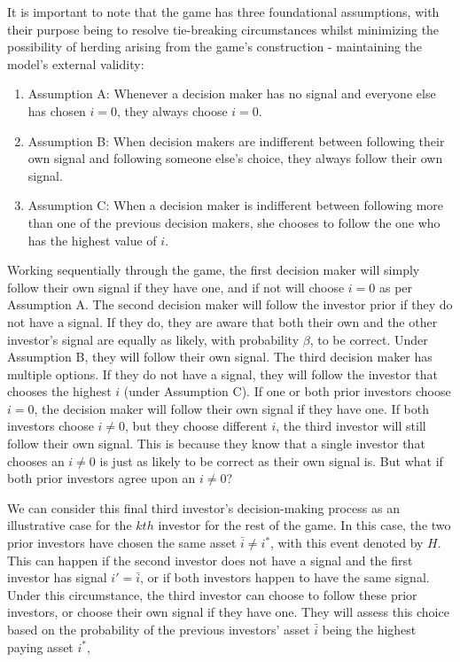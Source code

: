 \documentclass[12pt]{article}
\numberwithin{table}{section}   %
\begin{document}
It is important to note that the game has three foundational assumptions, with their purpose being to resolve tie-breaking circumstances whilst minimizing the possibility of herding arising from the game’s construction - maintaining the model’s external validity:

\begin{enumerate}
    \item Assumption A: Whenever a decision maker has no signal and everyone else has chosen $i=0$, they always choose $i=0$.
    \item Assumption B: When decision makers are indifferent between following their own signal and following someone else’s choice, they always follow their own signal.
    \item Assumption C: When a decision maker is indifferent between following more than one of the previous decision makers, she chooses to follow the one who has the highest value of $i$.
\end{enumerate}

Working sequentially through the game, the first decision maker will simply follow their own signal if they have one, and if not will choose $i=0$ as per Assumption A. The second decision maker will follow the investor prior if they do not have a signal. If they do, they are aware that both their own and the other investor’s signal are equally as likely, with probability $\beta$, to be correct. Under Assumption B, they will follow their own signal. The third decision maker has multiple options. If they do not have a signal, they will follow the investor that chooses the highest $i$ (under Assumption C). If one or both prior investors choose $i=0$, the decision maker will follow their own signal if they have one. If both investors choose $i\neq0$, but they choose different $i$, the third investor will still follow their own signal. This is because they know that a single investor that chooses an $i\neq0$ is just as likely to be correct as their own signal is. But what if both prior investors agree upon an $i\neq0$?

We can consider this final third investor’s decision-making process as an illustrative case for the $kth$ investor for the rest of the game. In this case, the two prior investors have chosen the same asset $\bar{i}\neq{i^*}$, with this event denoted by $H$. This can happen if the second investor does not have a signal and the first investor has signal $i'=\bar{i}$, or if both investors happen to have the same signal. Under this circumstance, the third investor can choose to follow these prior investors, or choose their own signal if they have one. They will assess this choice based on the probability of the previous investors’ asset $\bar{i}$ being the highest paying asset $i^*$,
\end{document}
